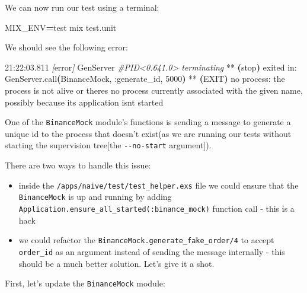 \documentclass[
  oneside]{book}
\newenvironment{Shaded}{\begin{snugshade}}{\end{snugshade}}
\newcommand{\CommentTok}[1]{\textcolor[rgb]{0.56,0.35,0.01}{\textit{#1}}}
\newcommand{\ErrorTok}[1]{\textcolor[rgb]{0.64,0.00,0.00}{\textbf{#1}}}
\newcommand{\ExtensionTok}[1]{#1}
\newcommand{\KeywordTok}[1]{\textcolor[rgb]{0.13,0.29,0.53}{\textbf{#1}}}
\newcommand{\NormalTok}[1]{#1}
\newcommand{\OperatorTok}[1]{\textcolor[rgb]{0.81,0.36,0.00}{\textbf{#1}}}
\newcommand{\PreprocessorTok}[1]{\textcolor[rgb]{0.56,0.35,0.01}{\textit{#1}}}
\newcommand{\SpecialStringTok}[1]{\textcolor[rgb]{0.31,0.60,0.02}{#1}}
\newcommand{\StringTok}[1]{\textcolor[rgb]{0.31,0.60,0.02}{#1}}
\newcommand{\VariableTok}[1]{\textcolor[rgb]{0.00,0.00,0.00}{#1}}
\providecommand{\tightlist}{%
  \setlength{\itemsep}{0pt}\setlength{\parskip}{0pt}}
\begin{document}
We can now run our test using a terminal:

\begin{Shaded}
\begin{Highlighting}[]
\VariableTok{MIX\_ENV}\OperatorTok{=}\NormalTok{test }\ExtensionTok{mix}\NormalTok{ test.unit}
\end{Highlighting}
\end{Shaded}

We should see the following error:

\begin{Shaded}
\begin{Highlighting}[]
\ExtensionTok{21:22:03.811} \PreprocessorTok{[}\SpecialStringTok{error}\PreprocessorTok{]}\NormalTok{ GenServer }\CommentTok{\#PID\textless{}0.641.0\textgreater{} terminating}
\ExtensionTok{**} \ErrorTok{(}\ExtensionTok{stop}\KeywordTok{)} \ExtensionTok{exited}\NormalTok{ in: GenServer.call}\ErrorTok{(}\ExtensionTok{BinanceMock,}\NormalTok{ :generate\_id, 5000}\KeywordTok{)}
    \ExtensionTok{**} \ErrorTok{(}\ExtensionTok{EXIT}\KeywordTok{)} \ExtensionTok{no}\NormalTok{ process: the process is not alive or there}\StringTok{\textquotesingle{}s no process currently}
\StringTok{       associated with the given name, possibly because its application isn\textquotesingle{}}\NormalTok{t started}
\end{Highlighting}
\end{Shaded}

One of the \texttt{BinanceMock} module's functions is sending a message to generate a unique id to the process that doesn't exist(as we are running our tests without starting the supervision tree{[}the \texttt{-\/-no-start} argument{]}).

There are two ways to handle this issue:

\begin{itemize}
\tightlist
\item
  inside the \texttt{/apps/naive/test/test\_helper.exs} file we could ensure that the \texttt{BinanceMock} is up and running by adding \texttt{Application.ensure\_all\_started(:binance\_mock)} function call - this is a hack
\item
  we could refactor the \texttt{BinanceMock.generate\_fake\_order/4} to accept \texttt{order\_id} as an argument instead of sending the message internally - this should be a much better solution. Let's give it a shot.
\end{itemize}

First, let's update the \texttt{BinanceMock} module:
\end{document}
